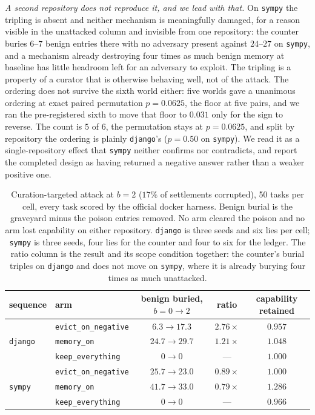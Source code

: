 \emph{A second repository does not reproduce it, and we lead with that.}
On \texttt{sympy} the tripling is absent and neither mechanism is
meaningfully damaged, for a reason visible in the unattacked column and
invisible from one repository: the counter buries $6$--$7$ benign entries
there with no adversary present against $24$--$27$ on \texttt{sympy}, and
a mechanism already destroying four times as much benign memory at
baseline has little headroom left for an adversary to exploit. The
tripling is a property of a curator that is otherwise behaving well, not
of the attack. The ordering does not survive the sixth world either: five
worlds gave a unanimous ordering at exact paired permutation
$p = 0.0625$, the floor at five pairs, and we ran the pre-registered
sixth to move that floor to $0.031$ only for the sign to reverse. The
count is $5$ of $6$, the permutation stays at $p = 0.0625$, and split by
repository the ordering is plainly \texttt{django}'s ($p = 0.50$ on
\texttt{sympy}). We read it as a single-repository effect that
\texttt{sympy} neither confirms nor contradicts, and report the completed
design as having returned a negative answer rather than a weaker positive
one.

\begin{table}[t]
\centering
\caption{Curation-targeted attack at $b{=}2$ ($17\%$ of settlements
corrupted), 50 tasks per cell, every task scored by the official docker
harness. Benign burial is the graveyard minus the poison entries removed.
No arm cleared the poison and no arm lost capability on either
repository. \texttt{django} is three seeds and six lies per cell;
\texttt{sympy} is three seeds, four lies for the counter and four to six
for the ledger. The ratio column is the result and its scope condition together:
the counter's burial triples on \texttt{django} and does not move on
\texttt{sympy}, where it is already burying four times as much
unattacked.}
\label{tab:swebench-attack}
\begin{tabular}{llccc}
\toprule
sequence & arm & benign buried, $b{=}0\to2$ & ratio & capability retained \\
\midrule
\multirow{3}{*}{\texttt{django}}
 & \texttt{evict\_on\_negative} & $6.3 \to 17.3$ & $2.76\times$ & $0.957$ \\
 & \texttt{memory\_on}          & $24.7 \to 29.7$ & $1.21\times$ & $1.048$ \\
 & \texttt{keep\_everything}    & $0 \to 0$ & --- & $1.000$ \\
\midrule
\multirow{3}{*}{\texttt{sympy}}
 & \texttt{evict\_on\_negative} & $25.7 \to 23.0$ & $0.89\times$ & $1.000$ \\
 & \texttt{memory\_on}          & $41.7 \to 33.0$ & $0.79\times$ & $1.286$ \\
 & \texttt{keep\_everything}    & $0 \to 0$ & --- & $0.966$ \\
\bottomrule
\end{tabular}
\end{table}

